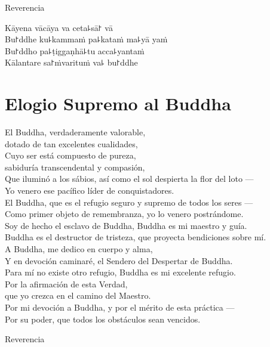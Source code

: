 \begin{instruction}
  Reverencia
\end{instruction}

Kāyena vācāya va ceta꜕sā꜓ vā\\
Bu꜓ddhe ku꜕kammaṁ pa꜕kataṁ ma꜕yā yaṁ\\
Bu꜓ddho pa꜕ṭiggaṇhā꜕tu acca꜕yantaṁ\\
Kālantare sa꜓ṁvarituṁ va꜕ bu꜓ddhe

\clearpage

\chapter{Elogio Supremo al Buddha}

\begin{leader}
\end{leader}

El Buddha, verdaderamente valorable,\\
\vin dotado de tan excelentes cualidades,\\
Cuyo ser está compuesto de pureza,\\
\vin sabiduría transcendental y compasión,\\
Que iluminó a los sábios, así como el sol despierta la flor del loto ---\\
Yo venero ese pacífico líder de conquistadores.\\
El Buddha, que es el refugio seguro y supremo de todos los seres ---\\
Como primer objeto de remembranza, yo lo venero postrándome.\\
Soy de hecho el esclavo de Buddha, Buddha es mi maestro y guía.\\
Buddha es el destructor de tristeza, que proyecta bendiciones sobre mí.\\
A Buddha, me dedico en cuerpo y alma,\\
Y en devoción caminaré, el Sendero del Despertar de Buddha.\\
Para mí no existe otro refugio, Buddha es mi excelente refugio.\\
Por la afirmación de esta Verdad,\\
\vin que yo crezca en el camino del Maestro.\\
Por mi devoción a Buddha, y por el mérito de esta práctica ---\\
Por su poder, que todos los obstáculos sean vencidos.

\begin{instruction}
  Reverencia
\end{instruction}

